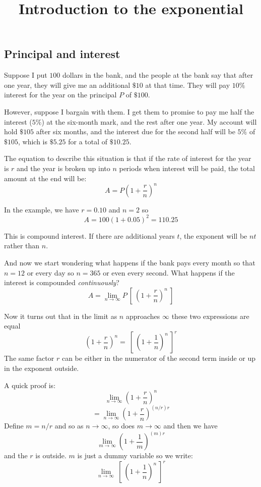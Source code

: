 \documentclass[11pt, oneside]{article}
\title{Introduction to the exponential}
\date{}
\begin{document}
\maketitle
\Large

\subsection*{Principal and interest}
Suppose I put $100$ dollars in the bank, and the people at the bank say that after one year, they will give me an additional $\$10$ at that time.  They will pay $10\%$ interest for the year on the principal $P$ of $\$100$.

However, suppose I bargain with them.  I get them to promise to pay me half the interest ($5\%$) at the six-month mark, and the rest after one year.  My account will hold $\$105$ after six months, and the interest due for the second half will be $5\%$ of $\$105$, which is $\$5.25$ for a total of $\$10.25$.

The equation to describe this situation is that if the rate of interest for the year is $r$ and the year is broken up into $n$ periods when interest will be paid, the total amount at the end will be:
\[ A = P(1 + \frac{r}{n})^n \]

In the example, we have $r = 0.10$ and $n = 2$ so
\[ A = 100 (1 + 0.05)^{2} = 110.25 \]

This is compound interest.  If there are additional years $t$, the exponent will be $nt$ rather than $n$.

And now we start wondering what happens if the bank pays every month so that $n=12$ or every day so $n=365$ or even every second.  What happens if the interest is compounded \emph{continuously}?
\[ A = \lim_{n \rightarrow \infty} P \ [ \ (1 + \frac{r}{n})^{n} \ ] \]

Now it turns out that in the limit as $n$ approaches $\infty$ these two expressions are equal
\[ (1 + \frac{r}{n})^n = \ [ \ (1 + \frac{1}{n})^n \ ]^r \]
The same factor $r$ can be either in the numerator of the second term inside or up in the exponent outside.  

A quick proof is:
\[ \lim_{n \rightarrow \infty} (1 + \frac{r}{n})^{n}  \]
\[ = \lim_{n \rightarrow \infty} (1 + \frac{r}{n})^{(n/r)r} \]
Define $m = n/r$ and so as $n \rightarrow \infty$, so does $m \rightarrow \infty$ and then we have
\[ \lim_{m \rightarrow \infty} (1 + \frac{1}{m})^{(m)r} \]
and the $r$ is outside.  $m$ is just a dummy variable so we write:
\[ \lim_{n \rightarrow \infty} \ [ \  (1 + \frac{1}{n})^{n} \ ]^r \]
\end{document}
